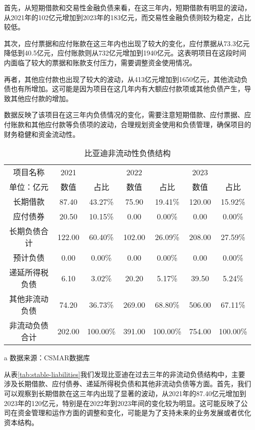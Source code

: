 首先，从短期借款和交易性金融负债来看，在这三年内，短期借款有明显的波动，从2021年的102亿元增加到2023年的183亿元，而交易性金融负债则较为稳定，占比较低。

其次，应付票据和应付账款在这三年内也出现了较大的变化，应付票据从73.3亿元降低到40.5亿元，应付账款则从732亿元增加到1940亿元。这表明项目在这段时间内面临了较大的票据和账款支付压力，需要调整资金使用情况。

再者，其他应付款也出现了较大的波动，从413亿元增加到1650亿元，其他流动负债也有所增加。这可能是因为项目在这几年内有大额应付款项或其他负债产生，导致其他应付款的增加。

数据反映了该项目在这三年内负债情况的变化，需要注意短期借款、应付票据、应付账款和其他应付款等负债项的波动，合理规划资金使用和负债管理，确保项目的财务稳健和资金流动性。

\begin{table}
  \centering
  \begin{threeparttable}[c]
    \caption{比亚迪非流动性负债结构}
    \label{tab:stable-liabilities}
    \begin{tabular}{ccccccc}
      \toprule
      项目名称 & 2021 & ~ & 2022 & ~ & 2023 & ~ \\ 
        单位：亿元 & 数值 & 占比 & 数值 & 占比 & 数值 & 占比 \\ 
      \midrule
        长期借款 & 87.40  & 43.27\% & 75.90  & 19.41\% & 120.00  & 15.92\% \\ 
        应付债券 & 20.50  & 10.15\% & 0.00  & 0.00\% & 0.00  & 0.00\% \\ 
        长期负债合计 & 122.00  & 60.40\% & 102.00  & 26.09\% & 208.00  & 27.59\% \\ 
        预计负债 & 0.00  & 0.00\% & 0.00  & 0.00\% & 0.00  & 0.00\% \\ 
        递延所得税负债 & 6.10  & 3.02\% & 20.20  & 5.17\% & 39.50  & 5.24\% \\ 
        其他非流动负债 & 74.20  & 36.73\% & 269.00  & 68.80\% & 506.00  & 67.11\% \\ 
        非流动负债合计 & 202.00  & 100.00\% & 391.00  & 100.00\% & 754.00  & 100.00\% \\ 
      \bottomrule
    \end{tabular}
    \begin{tablenotes}
      \item [a] 数据来源：CSMAR数据库
    \end{tablenotes}
  \end{threeparttable}
\end{table}
从表\eqref{tab:stable-liabilities}我们发现比亚迪在过去三年的非流动负债结构中，主要涉及长期借款、应付债券、递延所得税负债和其他非流动负债等方面。首先，我们可以观察到长期借款在这三年内出现了显著的波动，从2021年的87.40亿元增加到2023年的120亿元，特别是在2022年到2023年间的变化较为明显。这可能反映了公司在资金管理和运作方面的调整和变化，可能是为了支持未来的业务发展或者优化资本结构。

